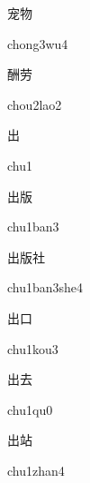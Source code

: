 \begin{multicols*}{2}
\begin{verbete}[chong3wu4]{宠物}
\begin{pronuncia}{chong3wu4}
\end{pronuncia}
\end{verbete}

\begin{verbete}{酬劳}
\begin{pronuncia}{chou2lao2}
\end{pronuncia}
\end{verbete}

\begin{verbete}[chu1]{出}
\begin{pronuncia}{chu1}
\end{pronuncia}
\end{verbete}

\begin{verbete}{出版}
\begin{pronuncia}{chu1ban3}
\end{pronuncia}
\end{verbete}

\begin{verbete}{出版社}
\begin{pronuncia}{chu1ban3she4}
\end{pronuncia}
\end{verbete}

\begin{verbete}{出口}
\begin{pronuncia}{chu1kou3}
\end{pronuncia}
\end{verbete}

\begin{verbete}[chu1qu0]{出去}
\begin{pronuncia}{chu1qu0}
\end{pronuncia}
\end{verbete}

\begin{verbete}{出站}
\begin{pronuncia}{chu1zhan4}
\end{pronuncia}
\end{verbete}


\end{multicols*}
